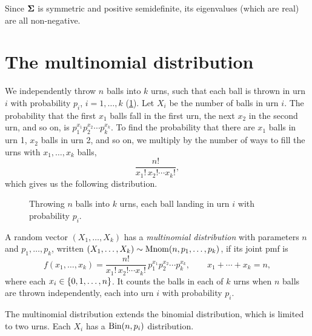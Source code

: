 \begin{remark}
Since $\bm{\Sigma}$ is symmetric and positive semidefinite, its eigenvalues (which are real) are all non-negative.
\end{remark}

\section{The multinomial distribution}\label{sec:multinomial}

We independently throw $n$ balls into $k$ urns, such that each ball is thrown in urn $i$ with probability $p_i$, $i = 1, \ldots, k$ (\cref{fig:balls-into-urns}). Let $X_i$ be the number of balls in urn $i$. The probability that the first $x_1$ balls fall in the first urn, the next $x_2$ in the second urn, and so on, is $p_1^{x_1} p_2^{x_2} \cdots p_k^{x_k}$. To find the probability that there are $x_1$ balls in urn 1, $x_2$ balls in urn 2, and so on, we multiply by the number of ways to fill the urns with $x_1, \ldots, x_k$ balls,
\[
  \frac{n!}{x_1!\,x_2! \cdots x_k!},
\]
which gives us the following distribution.

\begin{figure}[H]
\centering
{}
\caption{Throwing $n$ balls into $k$ urns, each ball landing in urn $i$ with probability $p_i$.}
\label{fig:balls-into-urns}
\end{figure}

\begin{definition}\label{def:multinomial}
A random vector $(X_1, \ldots, X_k)$ has a \emph{multinomial distribution} with parameters $n$ and $p_1, \ldots, p_k$, written $(X_1, \ldots, X_k) \sim \mathrm{Mnom}(n, p_1, \ldots, p_k)$, if its joint pmf is
\[
  f(x_1, \ldots, x_k) = \frac{n!}{x_1!\,x_2! \cdots x_k!}\,p_1^{x_1} p_2^{x_2} \cdots p_k^{x_k}, \qquad x_1 + \cdots + x_k = n,
\]
where each $x_i \in \left\{ 0, 1, \ldots, n \right\}$. It counts the balls in each of $k$ urns when $n$ balls are thrown independently, each into urn $i$ with probability $p_i$.
\end{definition}

\begin{remark}
The multinomial distribution extends the binomial distribution, which is limited to two urns. Each $X_i$ has a $\mathrm{Bin}(n, p_i)$ distribution.
\end{remark}
